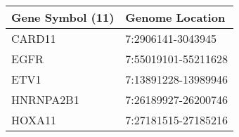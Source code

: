 \begin{tabular}{ll}
\toprule
Gene Symbol (11) &     Genome Location \\
\midrule
          CARD11 &   7:2906141-3043945 \\
            EGFR & 7:55019101-55211628 \\
            ETV1 & 7:13891228-13989946 \\
       HNRNPA2B1 & 7:26189927-26200746 \\
          HOXA11 & 7:27181515-27185216 \\
\bottomrule
\end{tabular}
